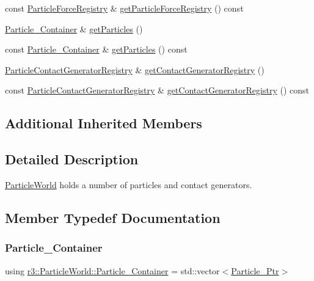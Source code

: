 \begin{DoxyCompactItemize}
\item 
const \mbox{\hyperlink{classr3_1_1_particle_force_registry}{Particle\+Force\+Registry}} \& \mbox{\hyperlink{classr3_1_1_particle_world_add0e006264e25065ff226eafc0c1a29d}{get\+Particle\+Force\+Registry}} () const
\item 
\mbox{\hyperlink{classr3_1_1_particle_world_aa354f6786c0837674fe8286f00465631}{Particle\+\_\+\+Container}} \& \mbox{\hyperlink{classr3_1_1_particle_world_a00a5014002f28e35ebb59a3f8175db3c}{get\+Particles}} ()
\item 
const \mbox{\hyperlink{classr3_1_1_particle_world_aa354f6786c0837674fe8286f00465631}{Particle\+\_\+\+Container}} \& \mbox{\hyperlink{classr3_1_1_particle_world_ab816d6bca8b42fdf16170275087008f0}{get\+Particles}} () const
\item 
\mbox{\hyperlink{classr3_1_1_particle_contact_generator_registry}{Particle\+Contact\+Generator\+Registry}} \& \mbox{\hyperlink{classr3_1_1_particle_world_a85fc9fcf5c51a5bbce206a35a82f8ccf}{get\+Contact\+Generator\+Registry}} ()
\item 
const \mbox{\hyperlink{classr3_1_1_particle_contact_generator_registry}{Particle\+Contact\+Generator\+Registry}} \& \mbox{\hyperlink{classr3_1_1_particle_world_ab5cd3adaed73294927de72f3293b0709}{get\+Contact\+Generator\+Registry}} () const
\end{DoxyCompactItemize}
\subsection*{Additional Inherited Members}


\subsection{Detailed Description}
\mbox{\hyperlink{classr3_1_1_particle_world}{Particle\+World}} holds a number of particles and contact generators. 

\subsection{Member Typedef Documentation}
\mbox{\label{classr3_1_1_particle_world_aa354f6786c0837674fe8286f00465631}} 
\subsubsection{\texorpdfstring{Particle\+\_\+\+Container}{Particle\_Container}}
{\footnotesize\ttfamily using \mbox{\hyperlink{classr3_1_1_particle_world_aa354f6786c0837674fe8286f00465631}{r3\+::\+Particle\+World\+::\+Particle\+\_\+\+Container}} =  std\+::vector$<$\mbox{\hyperlink{classr3_1_1_particle_world_a12b4624a202a6b22629a3328f083ac81}{Particle\+\_\+\+Ptr}}$>$}

